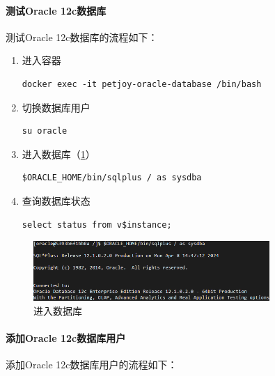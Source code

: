 \paragraph{测试Oracle 12c数据库}

测试Oracle 12c数据库的流程如下：

\begin{enumerate}
    \item 进入容器
          \begin{verbatim}
docker exec -it petjoy-oracle-database /bin/bash
          \end{verbatim}
    \item 切换数据库用户
          \begin{verbatim}
su oracle
          \end{verbatim}
    \item 进入数据库（\cref{fig:AccessToDatabase}）
          \begin{verbatim}
$ORACLE_HOME/bin/sqlplus / as sysdba
          \end{verbatim}
    \item 查询数据库状态
          \begin{verbatim}
select status from v$instance;
          \end{verbatim}
\end{enumerate}

\begin{figure}[htbp]
    \centering
    \includegraphics[width=0.8\textwidth]{figures/AccessToDatabase.png}
    \caption{进入数据库}
    \label{fig:AccessToDatabase}
\end{figure}

\paragraph{添加Oracle 12c数据库用户}

添加Oracle 12c数据库用户的流程如下：

